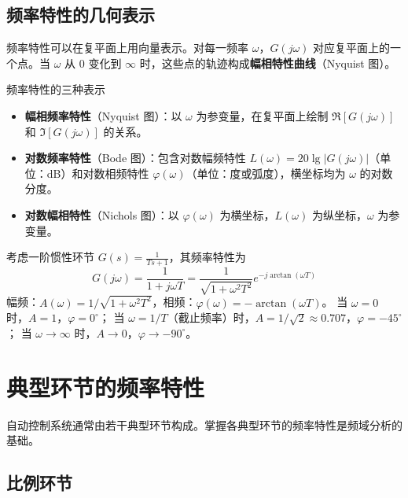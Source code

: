\subsection{频率特性的几何表示}

频率特性可以在复平面上用向量表示。对每一频率 $\omega$，$G(j\omega)$ 对应复平面上的一个点。当 $\omega$ 从 $0$ 变化到 $\infty$ 时，这些点的轨迹构成\textbf{幅相特性曲线}（Nyquist 图）。

\begin{mydefinition}{频率特性的三种表示}
\begin{itemize}
    \item \textbf{幅相频率特性}（Nyquist 图）：以 $\omega$ 为参变量，在复平面上绘制 $\Re[G(j\omega)]$ 和 $\Im[G(j\omega)]$ 的关系。
    \item \textbf{对数频率特性}（Bode 图）：包含对数幅频特性 $L(\omega) = 20\lg |G(j\omega)|$（单位：dB）和对数相频特性 $\varphi(\omega)$（单位：度或弧度），横坐标均为 $\omega$ 的对数分度。
    \item \textbf{对数幅相特性}（Nichols 图）：以 $\varphi(\omega)$ 为横坐标，$L(\omega)$ 为纵坐标，$\omega$ 为参变量。
\end{itemize}
\end{mydefinition}

\begin{example}
考虑一阶惯性环节 $G(s) = \frac{1}{Ts + 1}$，其频率特性为
\[
G(j\omega) = \frac{1}{1 + j\omega T} = \frac{1}{\sqrt{1 + \omega^2 T^2}} e^{-j\arctan(\omega T)}
\]
幅频：$A(\omega) = 1/\sqrt{1 + \omega^2 T^2}$，相频：$\varphi(\omega) = -\arctan(\omega T)$。
当 $\omega = 0$ 时，$A=1$，$\varphi = 0^{\circ}$；
当 $\omega = 1/T$（截止频率）时，$A = 1/\sqrt{2} \approx 0.707$，$\varphi = -45^{\circ}$；
当 $\omega \to \infty$ 时，$A \to 0$，$\varphi \to -90^{\circ}$。
\end{example}

\section{典型环节的频率特性}

自动控制系统通常由若干典型环节构成。掌握各典型环节的频率特性是频域分析的基础。

\subsection{比例环节}

